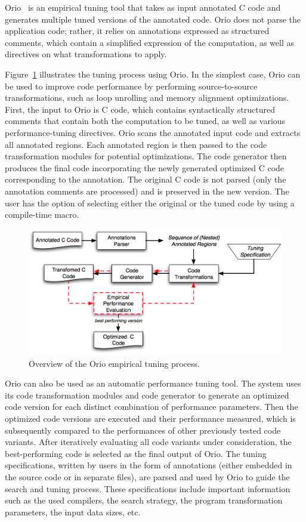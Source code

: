 \documentclass[11pt]{article}
\begin{document}
Orio~\cite{Norris:2007} is an empirical tuning tool that takes as input annotated C code and generates multiple tuned versions of the annotated code. Orio does not parse the application code; rather, it relies on annotations expressed as structured comments, which contain a simplified expression of the computation, as well as directives on what transformations to apply.


Figure~\ref{fig:orio} illustrates the tuning process using Orio. In the simplest case, Orio can be used to improve code performance by performing source-to-source transformations, such as loop unrolling and memory alignment optimizations. First, the input to Orio is C code, which contains syntactically structured comments that contain both the computation to be tuned, as well as various performance-tuning directives. Orio scans the annotated input code and extracts all annotated regions. Each annotated region is then passed to the code transformation modules for potential optimizations. The code generator then produces the final code incorporating the newly generated optimized C code corresponding to the annotation. The original C code is not parsed (only the annotation comments are processed) and is preserved in the new version. The user has the option of selecting either the original or the tuned code by using a compile-time macro.



\begin{figure}[htbp]
\centering
\includegraphics[width=.7\textwidth]{figures/orio.png}
\caption{Overview of the Orio empirical tuning process.}
\label{fig:orio}
\end{figure}

Orio can also be used as an automatic performance tuning tool. The system uses its code transformation modules and code generator to generate an optimized code version for each distinct combination of performance parameters. Then the optimized code versions are executed and their performance measured, which is subsequently compared to the performances of other previously tested code variants. After iteratively evaluating all code variants under consideration, the best-performing code is selected as the final output of Orio. The tuning specifications, written by users in the form of annotations (either embedded in the source code or in separate files), are parsed and used by Orio to guide the search and tuning process. These specifications include important information such as the used compilers, the search strategy, the program transformation parameters, the input data sizes, etc.
\end{document}
